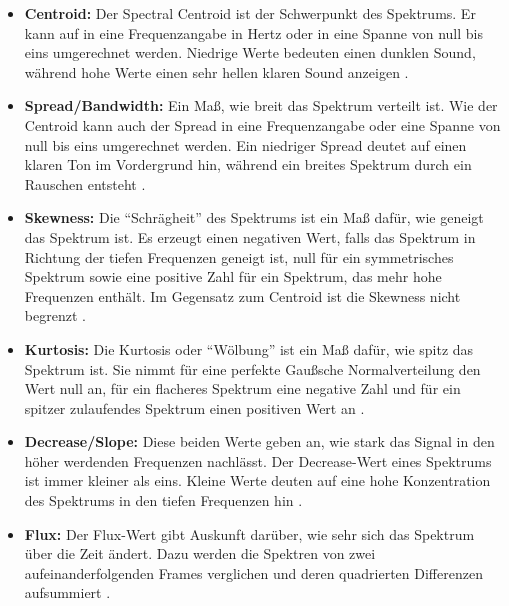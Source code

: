 \documentclass[11pt,a4paper]{article}
\begin{document}
\begin{itemize}
\item \textbf{Centroid:} Der Spectral Centroid ist der Schwerpunkt des Spektrums. Er kann auf in eine Frequenzangabe in Hertz oder in eine Spanne von null bis eins umgerechnet werden. Niedrige Werte bedeuten einen dunklen Sound, während hohe Werte einen sehr hellen klaren Sound anzeigen \cite[S. 45 f.]{lerch2012introduction}.

\item \textbf{Spread/Bandwidth:} Ein Maß, wie breit das Spektrum verteilt ist. Wie der Centroid kann auch der Spread in eine Frequenzangabe oder eine Spanne von null bis eins umgerechnet werden. Ein niedriger Spread deutet auf einen klaren Ton im Vordergrund hin, während ein breites Spektrum durch ein Rauschen entsteht \cite[S. 47 f.]{lerch2012introduction}.

\item \textbf{Skewness:} Die ``Schrägheit'' des Spektrums ist ein Maß dafür, wie geneigt das Spektrum ist. Es erzeugt einen negativen Wert, falls das Spektrum in Richtung der tiefen Frequenzen geneigt ist, null für ein symmetrisches Spektrum sowie eine positive Zahl für ein Spektrum, das mehr hohe Frequenzen enthält. Im Gegensatz zum Centroid ist die Skewness nicht begrenzt \cite[S. 38 f.]{lerch2012introduction}.

\item \textbf{Kurtosis:} Die Kurtosis oder ``Wölbung'' ist ein Maß dafür, wie spitz das Spektrum ist. Sie nimmt für eine perfekte Gaußsche Normalverteilung den Wert null an, für ein flacheres Spektrum eine negative Zahl und für ein spitzer zulaufendes Spektrum einen positiven Wert an \cite[S. 39 f.]{lerch2012introduction}.

\item \textbf{Decrease/Slope:} Diese beiden Werte geben an, wie stark das Signal in den höher werdenden Frequenzen nachlässt. Der Decrease-Wert eines Spektrums ist immer kleiner als eins. Kleine Werte deuten auf eine hohe Konzentration des Spektrums in den tiefen Frequenzen hin \cite[S. 49 f.]{lerch2012introduction}.

\item \textbf{Flux:} Der Flux-Wert gibt Auskunft darüber, wie sehr sich das Spektrum über die Zeit ändert. Dazu werden die Spektren von zwei aufeinanderfolgenden Frames verglichen und deren quadrierten Differenzen aufsummiert \cite[S. 44 f.]{lerch2012introduction}.


\end{itemize}
\end{document}
